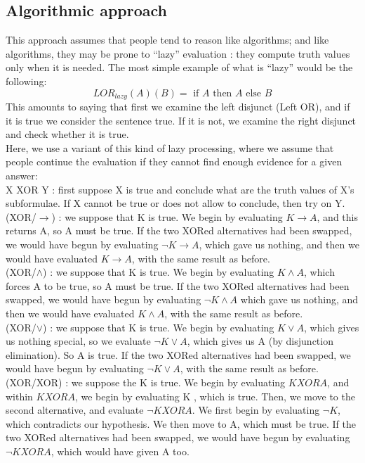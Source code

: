 \documentclass[french]{article}
\begin{document}
\subsection{Algorithmic approach}
This approach assumes that people tend to reason like algorithms; and like algorithms, they may be prone to ``lazy'' evaluation : they compute truth values only when it is needed. The most simple example of what is ``lazy'' would be the following:
\begin{equation*}
	LOR_{lazy}(A)(B) = \mbox{ if } A \mbox{ then } A \mbox{ else } B
\end{equation*}
This amounts to saying that first we examine the left disjunct (Left OR), and if it is true we consider the sentence true. If it is not, we examine the right disjunct and check whether it is true.\\
Here, we use a variant of this kind of lazy processing, where we assume that people continue the evaluation if they cannot find enough evidence for a given answer:\\
X XOR Y : first suppose X is true and conclude what are the truth values of X's subformulae. If X cannot be true or does not allow to conclude, then try on Y.\\
(XOR/$\rightarrow$) : we suppose that K is true. We begin by evaluating $K \rightarrow A$, and this returns A, so A must be true. If the two XORed alternatives had been swapped, we would have begun by evaluating $\neg K \rightarrow A$, which gave us nothing, and then we would have evaluated $K \rightarrow A$, with the same result as before.\\
(XOR/$\wedge$) : we suppose that K is true. We begin by evaluating $K \wedge A$, which forces A to be true, so A must be true. If the two XORed alternatives had been swapped, we would have begun by evaluating $\neg K \wedge A$ which gave us nothing, and then we would have evaluated $K \wedge A$, with the same result as before.\\
(XOR/$\vee$) : we suppose that K is true. We begin by evaluating $K \vee A$, which gives us nothing special, so we evaluate $\neg K \vee A$, which gives us A (by disjunction elimination). So A is true. If the two XORed alternatives had been swapped, we would have begun by evaluating $\neg K \vee A$, with the same result as before.
(XOR/XOR) : we suppose the K is true. We begin by evaluating $K XOR A$, and within $K XOR A$, we begin by evaluating K , which is true. Then, we move to the second alternative, and evaluate $ \neg K XOR A$. We first begin by evaluating $\neg K$, which contradicts our hypothesis. We then move to A, which must be true.  If the two XORed alternatives had been swapped, we would have begun by evaluating $\neg K XOR A$, which would have given A too.\\
\end{document}
